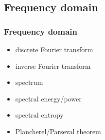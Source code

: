
\subsection{Frequency domain}

\begin{frame}
	\frametitle{Frequency domain}
	\begin{itemize}
		\item discrete Fourier transform
		\item inverse Fourier transform
		\item spectrum
		\item spectral energy/power
		\item spectral entropy
		\item Plancherel/Parseval theorem
	\end{itemize}
\end{frame}

